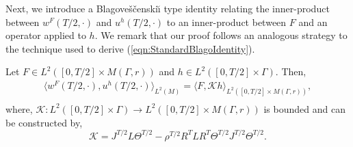 \documentclass[final,leqno]{siamart1116}
\begin{document}
Next, we introduce a Blagove{\v{s}}{\v{c}}enski{\u\i} type identity
relating the inner-product between $w^F(T/2,\cdot)$ and
$u^h(T/2,\cdot)$ to an inner-product between $F$ and an operator
applied to $h$. We remark that our proof follows an analogous strategy
to the technique used to derive (\ref{eqn:StandardBlagoIdentity}).
\begin{lemma}
  Let $F \in L^2([0,T/2] \times M(\Gamma,r))$ and $h \in L^2([0,T/2]
  \times \Gamma)$. Then,
  \begin{equation}
    \label{eqn:BlagoTypeInteriorBoundary}
    \begin{array}{l}
      \langle w^F(T/2,\cdot),u^h(T/2,\cdot) \rangle_{L^2(M)} = \langle F,{\mathcal{K}} h\rangle_{L^2([0,T/2] \times
        M(\Gamma,r))},\\
    \end{array}
  \end{equation}
  where,
  ${\mathcal{K}} : L^2([0,T/2] \times \Gamma) \rightarrow L^2([0,T/2]\times
  M(\Gamma,r))$ is bounded and can be constructed by,
  \begin{equation}
    \label{eqn:BlagoTypeInteriorOperatorExpr}
    {\mathcal{K}}  = J^{T/2} L \Theta^{T/2} - \rho^{T/2} R^TLR^T \Theta^{T/2}J^{T/2}\Theta^{T/2}.
  \end{equation}
\end{lemma}
\end{document}
